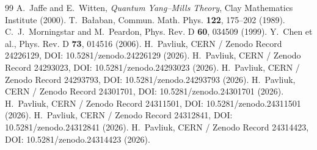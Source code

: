 \documentclass[11pt,a4paper]{article}
\begin{document}
\begin{thebibliography}{99}
 A.~Jaffe and E.~Witten, \textit{Quantum Yang--Mills Theory}, Clay Mathematics Institute (2000).
 T.~Ba\l{}aban, Commun. Math. Phys. \textbf{122}, 175--202 (1989).
 C.~J.~Morningstar and M.~Peardon, Phys. Rev. D \textbf{60}, 034509 (1999).
 Y.~Chen et al., Phys. Rev. D \textbf{73}, 014516 (2006).
 H.~Pavliuk, CERN / Zenodo Record 24226129, DOI: 10.5281/zenodo.24226129 (2026).
 H.~Pavliuk, CERN / Zenodo Record 24293023, DOI: 10.5281/zenodo.24293023 (2026).
 H.~Pavliuk, CERN / Zenodo Record 24293793, DOI: 10.5281/zenodo.24293793 (2026).
 H.~Pavliuk, CERN / Zenodo Record 24301701, DOI: 10.5281/zenodo.24301701 (2026).
 H.~Pavliuk, CERN / Zenodo Record 24311501, DOI: 10.5281/zenodo.24311501 (2026).
 H.~Pavliuk, CERN / Zenodo Record 24312841, DOI: 10.5281/zenodo.24312841 (2026).
 H.~Pavliuk, CERN / Zenodo Record 24314423, DOI: 10.5281/zenodo.24314423 (2026).
\end{thebibliography}
\end{document}
